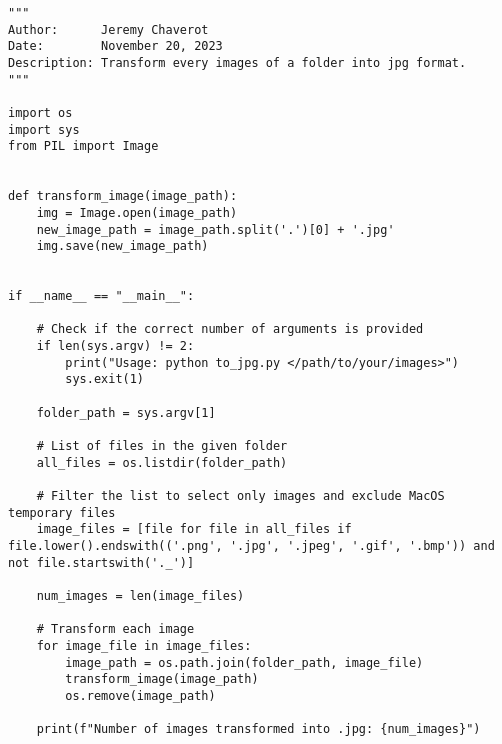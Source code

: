 \begin{lstlisting}[style=pythonstyle, label=lst:3, caption=Python script \texttt{to\_jpg.py} to transform every images of a specified folder into \texttt{jpg} format.]
"""
Author:      Jeremy Chaverot
Date:        November 20, 2023
Description: Transform every images of a folder into jpg format.
"""

import os
import sys
from PIL import Image


def transform_image(image_path):
    img = Image.open(image_path)
    new_image_path = image_path.split('.')[0] + '.jpg'
    img.save(new_image_path)


if __name__ == "__main__":

	# Check if the correct number of arguments is provided
    if len(sys.argv) != 2:
        print("Usage: python to_jpg.py </path/to/your/images>")
        sys.exit(1)

    folder_path = sys.argv[1]

    # List of files in the given folder
    all_files = os.listdir(folder_path)
    
    # Filter the list to select only images and exclude MacOS temporary files
    image_files = [file for file in all_files if file.lower().endswith(('.png', '.jpg', '.jpeg', '.gif', '.bmp')) and not file.startswith('._')]
    
    num_images = len(image_files)

    # Transform each image
    for image_file in image_files:
        image_path = os.path.join(folder_path, image_file)
        transform_image(image_path)
        os.remove(image_path)

    print(f"Number of images transformed into .jpg: {num_images}")
\end{lstlisting}

\cleardoublepage{}

